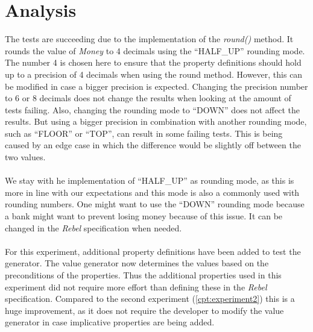 \section{Analysis}
The tests are succeeding due to the implementation of the \textit{round()} method. It rounds the value of \textit{Money} to 4 decimals using the ``HALF\_UP'' rounding mode. The number 4 is chosen here to ensure that the property definitions should hold up to a precision of 4 decimals when using the round method. However, this can be modified in case a bigger precision is expected. Changing the precision number to 6 or 8 decimals does not change the results when looking at the amount of tests failing. Also, changing the rounding mode to ``DOWN'' does not affect the results. But using a bigger precision in combination with another rounding mode, such as ``FLOOR'' or ``TOP'', can result in some failing tests. This is being caused by an edge case in which the difference would be slightly off between the two values.\\
\\
We stay with he implementation of ``HALF\_UP'' as rounding mode, as this is more in line with our expectations and this mode is also a commonly used with rounding numbers. One might want to use the ``DOWN'' rounding mode because a bank might want to prevent losing money because of this issue. It can be changed in the \textit{Rebel} specification when needed.\\
\\
For this experiment, additional property definitions have been added to test the generator. The value generator now determines the values based on the preconditions of the properties. Thus the additional properties used in this experiment did not require more effort than defining these in the \textit{Rebel} specification. Compared to the second experiment (\autoref{cpt:experiment2}) this is a huge improvement, as it does not require the developer to modify the value generator in case implicative properties are being added.

